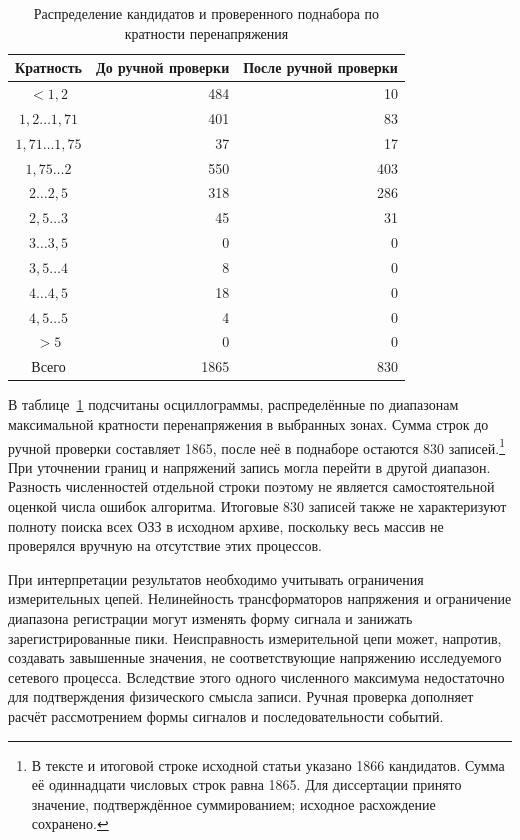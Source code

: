 \begin{table}[htbp]
\centering
\caption{Распределение кандидатов и проверенного поднабора по кратности перенапряжения}
\label{tab:ch3_earth_fault_selection}
\begin{tabular}{|c|r|r|}
\hline
Кратность & До ручной проверки & После ручной проверки \\
\hline
$<1{,}2$ & 484 & 10 \\
$1{,}2\ldots1{,}71$ & 401 & 83 \\
$1{,}71\ldots1{,}75$ & 37 & 17 \\
$1{,}75\ldots2$ & 550 & 403 \\
$2\ldots2{,}5$ & 318 & 286 \\
$2{,}5\ldots3$ & 45 & 31 \\
$3\ldots3{,}5$ & 0 & 0 \\
$3{,}5\ldots4$ & 8 & 0 \\
$4\ldots4{,}5$ & 18 & 0 \\
$4{,}5\ldots5$ & 4 & 0 \\
$>5$ & 0 & 0 \\
\hline
Всего & 1865 & 830 \\
\hline
\end{tabular}
\end{table}

В таблице~\ref{tab:ch3_earth_fault_selection} подсчитаны осциллограммы,
распределённые по диапазонам максимальной кратности перенапряжения
в выбранных зонах. Сумма строк до ручной проверки составляет 1865,
после неё в поднаборе остаются 830 записей.\footnote{В тексте и итоговой
строке исходной статьи указано 1866 кандидатов. Сумма её одиннадцати
числовых строк равна 1865. Для диссертации принято значение,
подтверждённое суммированием; исходное расхождение сохранено.}
При уточнении границ и напряжений запись могла перейти в другой
диапазон. Разность численностей отдельной строки поэтому не является
самостоятельной оценкой числа ошибок алгоритма. Итоговые 830 записей
также не характеризуют полноту поиска всех ОЗЗ в исходном архиве,
поскольку весь массив не проверялся вручную на отсутствие этих процессов.

При интерпретации результатов необходимо учитывать ограничения
измерительных цепей. Нелинейность трансформаторов напряжения и
ограничение диапазона регистрации могут изменять форму сигнала
и занижать зарегистрированные пики. Неисправность измерительной цепи
может, напротив, создавать завышенные значения, не соответствующие
напряжению исследуемого сетевого процесса. Вследствие этого одного
численного максимума недостаточно для подтверждения физического
смысла записи. Ручная проверка дополняет расчёт рассмотрением
формы сигналов и последовательности событий.

